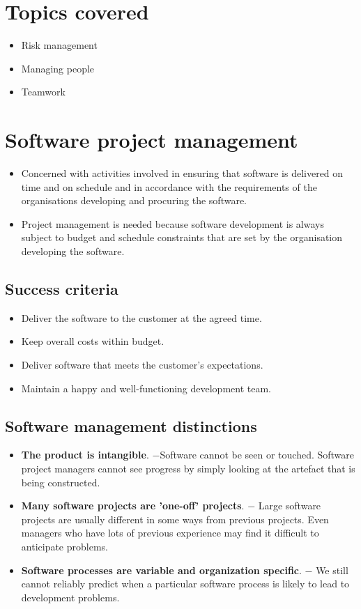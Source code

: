 \section{ Topics covered}
\begin{itemize}
\item Risk management
\item Managing people
\item Teamwork
\end{itemize}

\section{ Software project management}
\begin{itemize}
\item Concerned with activities involved in ensuring that software is delivered on time and on schedule and in accordance with the requirements of the organisations developing and procuring the software.
\item Project management is needed because software development is always subject to budget and schedule constraints that are set by the organisation developing the software.
\end{itemize}

\subsection{ Success criteria}
\begin{itemize}
\item Deliver the software to the customer at the agreed time.
\item Keep overall costs within budget.
\item Deliver software that meets the customer’s expectations.
\item Maintain a happy and well-functioning development team.
\end{itemize}

\subsection{ Software management distinctions}
\begin{itemize}
\item \textbf{The product is intangible}.
\newline $-$Software cannot be seen or touched. Software project managers cannot see progress by simply looking at the artefact that is being constructed.
\item \textbf{Many software projects are 'one-off' projects}.
\newline $-$ Large software projects are usually different in some ways from previous projects. Even managers who have lots of previous experience may find it difficult to anticipate problems.
\item \textbf{Software processes are variable and organization specific}.
\newline $-$ We still cannot reliably predict when a particular software process is likely to lead to development problems.
\end{itemize}

